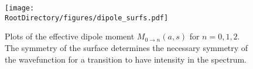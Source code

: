 \begin{figure}[ht]
\begin{center}
    \texttt{[image: \\RootDirectory/figures/dipole\_surfs.pdf]}
    \caption{
   Plots of the effective dipole moment $M_{0 \rightarrow n}(a, s)$ for $n=0, 1, 2$. The symmetry of the surface determines the necessary symmetry of the wavefunction for a transition to have intensity in the spectrum.
    }
\label{fig:dipole_surfaces}
\end{center}
\end{figure}
